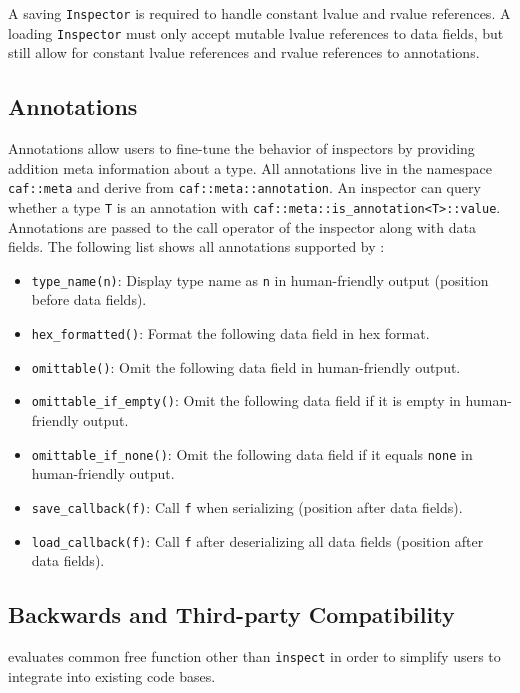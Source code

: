 A saving \lstinline^Inspector^ is required to handle constant lvalue and rvalue references. A loading \lstinline^Inspector^ must only accept mutable lvalue references to data fields, but still allow for constant lvalue references and rvalue references to annotations.

\subsection{Annotations}

Annotations allow users to fine-tune the behavior of inspectors by providing addition meta information about a type. All annotations live in the namespace \lstinline^caf::meta^ and derive from \lstinline^caf::meta::annotation^. An inspector can query whether a type \lstinline^T^ is an annotation with \lstinline^caf::meta::is_annotation<T>::value^. Annotations are passed to the call operator of the inspector along with data fields. The following list shows all annotations supported by \lib:

\begin{itemize}
\item \lstinline^type_name(n)^: Display type name as \lstinline^n^ in human-friendly output (position before data fields).
\item \lstinline^hex_formatted()^: Format the following data field in hex format.
\item \lstinline^omittable()^: Omit the following data field in human-friendly output.
\item \lstinline^omittable_if_empty()^: Omit the following data field if it is empty in human-friendly output.
\item \lstinline^omittable_if_none()^: Omit the following data field if it equals \lstinline^none^ in human-friendly output.
\item \lstinline^save_callback(f)^: Call \lstinline^f^ when serializing  (position after data fields).
\item \lstinline^load_callback(f)^: Call \lstinline^f^ after deserializing all data fields (position after data fields).
\end{itemize}

\subsection{Backwards and Third-party Compatibility}

\lib evaluates common free function other than \lstinline^inspect^ in order to simplify users to integrate \lib into existing code bases.

